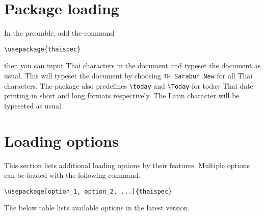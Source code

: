 \documentclass{article}
\begin{document}
\section{Package loading}
In the preamble, add the command
\begin{verbatim}
\usepackage{thaispec}
\end{verbatim}
then you can input Thai characters in the document and typeset the document as usual.
This will typeset the document by choosing \texttt{TH Sarabun New} for all Thai characters.
The package also predefines \texttt{\textbackslash today} and \texttt{\textbackslash Today}
for today Thai date printing in short and long formats respectively.
The Latin character will be typeseted as usual.



\section{Loading options}
This section lists additional loading options by their features.
Multiple options can be loaded with the following command.
\begin{verbatim}
\usepackage[option_1, option_2, ...]{thaispec}
\end{verbatim}
The below table lists available options in the latest version.
\end{document}
